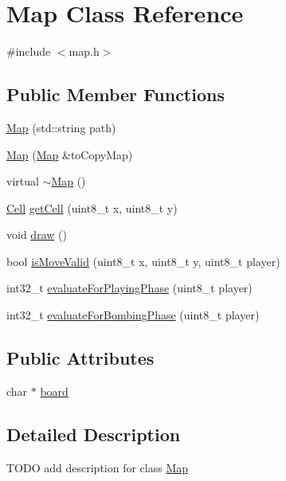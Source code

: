 \hypertarget{class_map}{}\section{Map Class Reference}
\label{class_map}


{\ttfamily \#include $<$map.\+h$>$}

\subsection*{Public Member Functions}
\begin{DoxyCompactItemize}
\item 
\hyperlink{class_map_a55ee42b4e899706549e3463bd6313334}{Map} (std\+::string path)
\item 
\hyperlink{class_map_a07c1670f6869ae4d2870bd99ad69aae8}{Map} (\hyperlink{class_map}{Map} \&to\+Copy\+Map)
\item 
virtual \hyperlink{class_map_aa403fbe09394ccf39747588f5168e3b2}{$\sim$\+Map} ()
\item 
\hyperlink{struct_cell}{Cell} \hyperlink{class_map_adb0eda229eadaeed3b9a5d2d3ee50549}{get\+Cell} (uint8\+\_\+t x, uint8\+\_\+t y)
\item 
void \hyperlink{class_map_a6a40755f8541eece2fa48e9e24a588f8}{draw} ()
\item 
bool \hyperlink{class_map_a5fbfd15cea00d65e57a42ce8cfa47c57}{is\+Move\+Valid} (uint8\+\_\+t x, uint8\+\_\+t y, uint8\+\_\+t player)
\item 
int32\+\_\+t \hyperlink{class_map_ae6b13c562aae3c06864c3bd6e03f2b67}{evaluate\+For\+Playing\+Phase} (uint8\+\_\+t player)
\item 
int32\+\_\+t \hyperlink{class_map_a5f03558623c19e671ad59ba78f065b7a}{evaluate\+For\+Bombing\+Phase} (uint8\+\_\+t player)
\end{DoxyCompactItemize}
\subsection*{Public Attributes}
\begin{DoxyCompactItemize}
\item 
char $\ast$ \hyperlink{class_map_a4576d77f3c95eaa29c6d3a9ea5b5ff7d}{board}
\end{DoxyCompactItemize}


\subsection{Detailed Description}
T\+O\+DO add description for class \hyperlink{class_map}{Map} 

